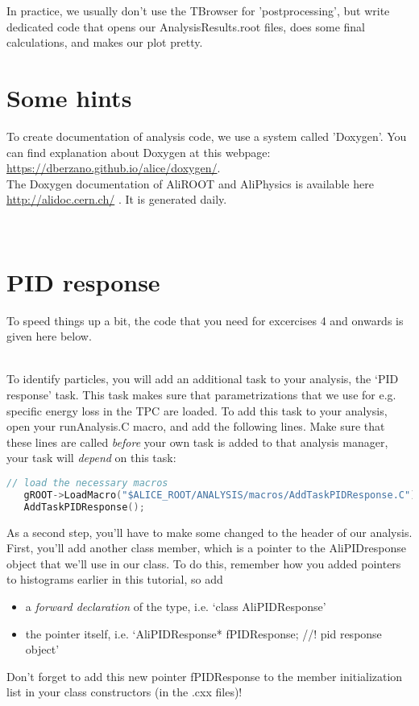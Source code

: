 \documentclass{article}
\begin{document}
In practice, we usually don't use the TBrowser for 'postprocessing', but write dedicated code that opens our AnalysisResults.root files, does some final calculations, and makes our plot pretty. 
\section{Some hints}

To create documentation of analysis code, we use a system called 'Doxygen'. You can find explanation about Doxygen at this webpage: \href{https://dberzano.github.io/alice/doxygen/}{https://dberzano.github.io/alice/doxygen/}. 
\\

The Doxygen documentation of AliROOT and AliPhysics is available here \href{http://alidoc.cern.ch/}{http://alidoc.cern.ch/} . It is generated daily. 

\\

\section{PID response}
To speed things up a bit, the code that you need for excercises 4 and onwards is given here below. 

\\
To identify particles, you will add an additional task to your analysis, the `PID response' task. This task makes sure that parametrizations that we use for e.g. specific energy loss in the TPC are loaded. To add this task to your analysis, open your runAnalysis.C macro, and add the following lines. Make sure that these lines are called \emph{before} your own task is added to that analysis manager, your task will \emph{depend} on this task:

\begin{lstlisting}[language=C, number=left]
   // load the necessary macros
   gROOT->LoadMacro("$ALICE_ROOT/ANALYSIS/macros/AddTaskPIDResponse.C");
   AddTaskPIDResponse();\end{lstlisting}


As a second step, you'll have to make some changed to the header of our analysis. First, you'll add another class member, which is a pointer to the AliPIDresponse object that we'll use in our class. To do this, remember how you added pointers to histograms earlier in this tutorial, so add
\begin{itemize}
\item a \emph{forward declaration} of the type, i.e. `class   AliPIDResponse'
\item the pointer itself, i.e.   `AliPIDResponse*       fPIDResponse;   //! pid response object'
\end{itemize}
   Don't forget to add this new pointer fPIDResponse to the member initialization list in your class constructors (in the .cxx files)!
\\
\end{document}
